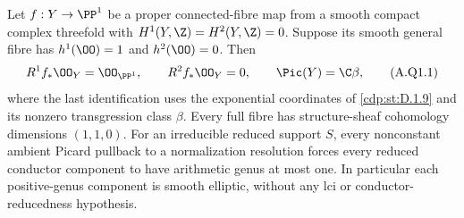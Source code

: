 
\begin{proposition}[The conductor bound when the general fibre has $q=1$ and $p_g=0$]\label{cdp:st:A.5.13}
Let $f:Y\to\PP^1$ be a proper connected-fibre map from
a smooth compact complex threefold with
$H^1(Y,\Z)=H^2(Y,\Z)=0$. Suppose its smooth general
fibre has $h^1(\OO)=1$ and $h^2(\OO)=0$.
Then
\[
 R^1f_*\OO_Y=\OO_{\PP^1},\qquad R^2f_*\OO_Y=0,
 \qquad\Pic(Y)=\C\beta,                            \tag{A.Q1.1}\label{cdp:eq:A.Q1.1}
\]
where the last identification uses the exponential
coordinates of \ref{cdp:st:D.1.9} and its nonzero transgression
class $\beta$. Every full fibre has structure-sheaf
cohomology dimensions $(1,1,0)$.
For an irreducible reduced support $S$, every
nonconstant ambient Picard pullback to a normalization
resolution forces every reduced conductor component
to have arithmetic genus at most one. In particular
each positive-genus component is smooth elliptic,
without any lci or conductor-reducedness hypothesis.
\end{proposition}
